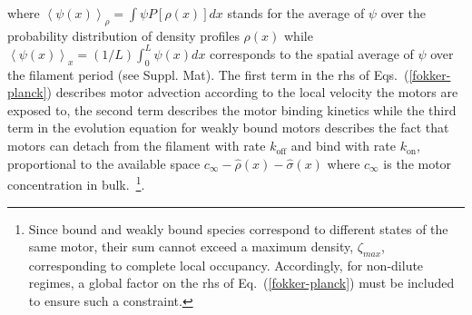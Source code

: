 \documentclass[prl,aps,twocolumn, floatfix, superscriptaddress,showpacs]{revtex4}
\begin{document}
where $\left\langle \psi(x)\right\rangle_{\rho}=\int \psi P[\rho(x)] dx$ stands for the average of $\psi$ over the probability distribution of density profiles $\rho(x)$ while $\left\langle \psi(x)\right\rangle_{x}=(1/L) \int_0^L \psi(x) dx$ corresponds to the spatial average of $\psi$ over the filament period (see Suppl. Mat).  The first term in the rhs of Eqs.~(\ref{fokker-planck}) describes motor advection according to the  local velocity the motors are exposed to, the second term describes the  motor binding kinetics while the third term in the evolution equation for weakly bound motors describes the fact that motors can  detach from the filament with rate $k_{\mbox{off}}$ and bind with rate $k_{\mbox{on}}$, proportional to the available space $c_{\infty}-\hat{\rho}(x)-\hat{\sigma}(x)$ where $c_{\infty}$ is the motor concentration in bulk.~\footnote{Since bound and weakly bound species correspond to different states of the same motor, their sum cannot exceed a maximum density, $\zeta_{max}$, corresponding to complete local occupancy. Accordingly, for non-dilute regimes, a global factor on the rhs of Eq.~(\ref{fokker-planck}) must be included to ensure such a constraint.}.

\end{document}
